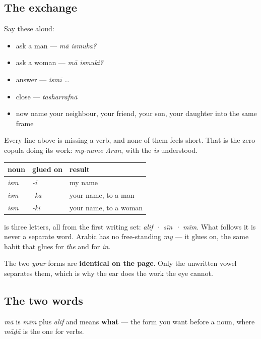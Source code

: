 \subsection*{The exchange}
Say these aloud:

\begin{itemize}
\raggedright
  \item ask a man — \emph{mā ismuka?}
  \item ask a woman — \emph{mā ismuki?}
  \item answer — \emph{ismī …}
  \item close — \emph{tasharrafnā}
  \item now name your neighbour, your friend, your son, your daughter into the same frame
\end{itemize}

Every line above is missing a verb, and none of them feels short. That is the zero copula doing its work: \emph{my-name Arun}, with the \emph{is} understood.

\begin{grammarlens}[title={Grammar Lens: the suffix set, whole}]
\noindent
\begin{tabularx}{\linewidth}{@{}>{\raggedright\arraybackslash}X>{\raggedright\arraybackslash}X>{\raggedright\arraybackslash}X@{}}
\toprule
\textbf{noun} & \textbf{glued on} & \textbf{result} \\
\midrule
\textbf{\ar{اسم}} \emph{ism} & \textbf{\ar{ـي}} \emph{-ī} & \textbf{\ar{اسمي}} my name \\
\textbf{\ar{اسم}} \emph{ism} & \textbf{\ar{ـك}} \emph{-ka} & \textbf{\ar{اسمك}} your name, to a man \\
\textbf{\ar{اسم}} \emph{ism} & \textbf{\ar{ـك}} \emph{-ki} & \textbf{\ar{اسمك}} your name, to a woman \\
\bottomrule
\end{tabularx}

\textbf{} is three letters, all from the first writing set: \emph{alif · sīn · mīm}. What follows it is never a separate word. Arabic has no free-standing \emph{my} — it glues \textbf{} on, the same habit that glues \textbf{} for \emph{the} and \textbf{} for \emph{in}.

The two \emph{your} forms are \textbf{identical on the page}. Only the unwritten vowel separates them, which is why the ear does the work the eye cannot.
\end{grammarlens}

\subsection*{The two words}
\textbf{} \emph{mā} is \emph{mīm} plus \emph{alif} and means \textbf{what} — the form you want before a noun, where \emph{māḏā} is the one for verbs.

